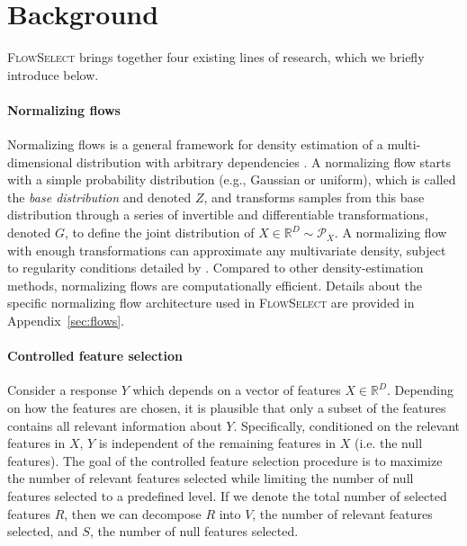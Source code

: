\documentclass{article}
\newcommand{\FlowSelect}{\textsc{FlowSelect}\xspace}
\begin{document}
\section{Background}\label{sec:background}

\FlowSelect brings together four existing lines of research, which we briefly introduce below.

\paragraph{Normalizing flows} Normalizing flows is a general framework for density estimation of a multi-dimensional distribution with arbitrary dependencies \citep{papamakariosNormalizingFlowsProbabilistic2019a}.
A normalizing flow starts with a simple probability distribution (e.g., Gaussian or uniform), which is called the \textit{base distribution} and denoted $Z$, and transforms samples from this base distribution through a series of invertible and differentiable transformations, denoted $G$, to define the joint distribution of $X \in \mathbb{R}^D \sim \mathcal P_X$.
A normalizing flow with enough transformations can approximate any multivariate density, subject to regularity conditions detailed by \citet{kobyzevNormalizingFlowsIntroduction2020}.
Compared to other density-estimation methods, normalizing flows are computationally efficient.
Details about the specific normalizing flow architecture used in \FlowSelect are provided in Appendix~\ref{sec:flows}.

\paragraph{Controlled feature selection} Consider a response $Y$ which depends on a vector of features $X \in \mathbb{R}^D$.
Depending on how the features are chosen, it is plausible that only a subset of the features contains all relevant information about $Y$.
Specifically, conditioned on the relevant features in $X$, $Y$ is independent of the remaining features in $X$ (i.e. the null features).
The goal of the controlled feature selection procedure is to maximize the number of relevant features selected while limiting the number of null features selected to a predefined level.
If we denote the total number of selected features $R$, then we can decompose $R$ into $V$, the number of relevant features selected, and $S$, the number of null features selected.
\end{document}
